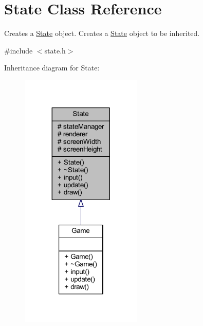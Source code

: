 \hypertarget{class_state}{\section{State Class Reference}
\label{class_state}
}


Creates a \hyperlink{class_state}{State} object. Creates a \hyperlink{class_state}{State} object to be inherited.  




{\ttfamily \#include $<$state.\+h$>$}



Inheritance diagram for State\+:
\nopagebreak
\begin{figure}[H]
\begin{center}
\leavevmode
\includegraphics[width=164pt]{class_state__inherit__graph}
\end{center}
\end{figure}


